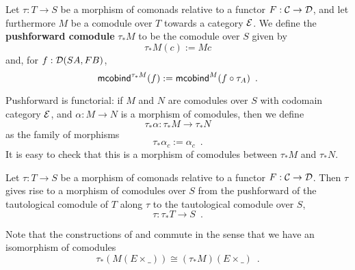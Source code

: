\documentclass{amsart}
\newcommand{\fat}[1]{\textbf{#1}}
\begin{document}
\begin{definition}\label{def:pushforward_comodule}
  Let $\tau : T\to S$ be a morphism of comonads relative to a functor $F : \C \to \D$, and let furthermore $M$ be a 
  comodule over $T$ towards a category $\E$. We define the \fat{pushforward comodule} $\tau_*M$ to be the comodule over $S$ given by
  \[  \tau_*M(c) := Mc \]
  and, for $f : \D(SA,FB)$,
   \[ \mcobind^{\tau_*M}(f) := \mcobind^M(\comp{\tau_A}{f}) \enspace . \]
   
  \noindent
  Pushforward is functorial: if $M$ and $N$ are comodules over $S$ with codomain category $\E$, and $\alpha : M\to N$ is 
    a morphism of comodules, then we define \[\tau_*\alpha : \tau_*M \to \tau_*N\] 
    as the family of morphisms
     \[ \tau_*\alpha_c := \alpha_c \enspace . \]
  It is easy to check that this is a morphism of comodules between $\tau_*M$ and $\tau_*N$.
\end{definition}


\begin{definition}
  Let $\tau : T\to S$ be a morphism of comonads relative to a functor $F : \C \to \D$.
  Then $\tau$ gives rise to a morphism of comodules over $S$ from the pushforward of the tautological comodule
  of $T$ along $\tau$ to the tautological comodule over $S$,
  \[ \tau : \tau_*T \to S \enspace . \]
\end{definition}


\begin{remark}\label{rem:prod_pullback_commute}
 Note that the constructions of  and  commute in the sense that
 we have an isomorphism of comodules \[\tau_*(M(E\times \_)) \cong (\tau_*M)(E \times \_) \enspace . \]
\end{remark}
\end{document}
